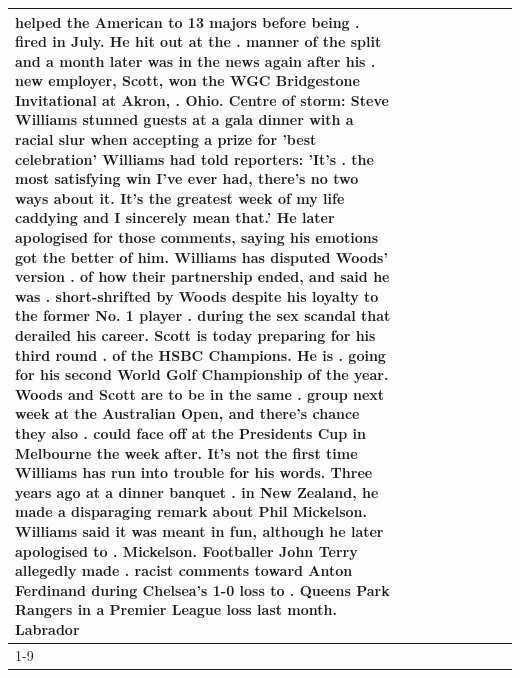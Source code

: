 \begin{table}[H]
\begin{tabular}{lllrlllll}
helped the American to 13 majors before being . fired in July. He hit out at the . manner of the split and a month later was in the news again after his . new employer, Scott, won the WGC Bridgestone Invitational at Akron, . Ohio. Centre of storm: Steve Williams stunned guests at a gala dinner with a racial slur when accepting a prize for 'best celebration' Williams had told reporters: 'It's . the most satisfying win I've ever had, there's no two ways about it. It's the greatest week of my life caddying and I sincerely mean that.' He later apologised for those comments, saying his emotions got the better of him. Williams has disputed Woods' version . of how their partnership ended, and said he was . short-shrifted by Woods despite his loyalty to the former No. 1 player . during the sex scandal that derailed his career. Scott is today preparing for his third round . of the HSBC Champions. He is . going for his second World Golf Championship of the year. Woods and Scott are to be in the same . group next week at the Australian Open, and there's chance they also . could face off at the Presidents Cup in Melbourne the week after. It's not the first time Williams has run into trouble for his words. Three years ago at a dinner banquet . in New Zealand, he made a disparaging remark about Phil Mickelson. Williams said it was meant in fun, although he later apologised to . Mickelson. Footballer John Terry allegedly made . racist comments toward Anton Ferdinand during Chelsea's 1-0 loss to . Queens Park Rangers in a Premier League loss last month. Labrador \\
\cline{1-9}

\end{tabular}
\end{table}
